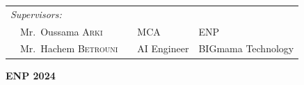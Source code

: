 {\begin{titlepage}
\begin{flushleft}
\begin{tabular}{llcll}
            \\
            \textit{Supervisors:}                                  &  &             &                    \\
            \multicolumn{2}{l}{~~Mr.\ Oussama \textsc{Arki}}       &  & MCA         & ENP                \\
            \multicolumn{2}{l}{~~Mr.\ Hachem \textsc{Betrouni}}    &  & AI Engineer & BIGmama Technology \\
        \end{tabular}
    \end{flushleft}

    \vspace*{7mm}
    \begin{center}
        \textbf{ENP 2024}
    \end{center}

\end{titlepage}
}